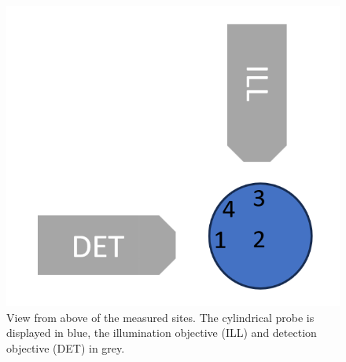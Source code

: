 \begin{figure}[ht]
    \centering
    \includegraphics[width = \textwidth]{Bilder/Setup/sites.png}
    \caption{View from above of the measured sites. The cylindrical probe is displayed in blue, the illumination objective (ILL) and detection objective (DET) in grey.}
    \label{fig:sites}
\end{figure}